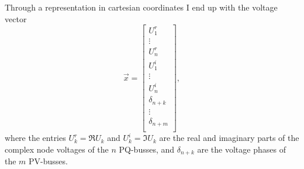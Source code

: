 Through a representation in cartesian coordinates I end up with the voltage vector
\begin{equation}
	\vec x = 
	\begin{bmatrix}
		U_1^r \\
		\vdots \\
		U_n^r \\
		U_1^i \\
		\vdots \\
		U_n^i \\
		\delta_{n+k} \\
		\vdots \\
		\delta_{n+m} \\
	\end{bmatrix},
\end{equation}
where the entries $U_k^r = \Re{U_k}$ and $U_k^i = \Im{U_k}$ are the real and imaginary parts of the complex node voltages of the $n$ PQ-busses, and $\delta_{n+k}$ are the voltage phases of the $m$ PV-busses.

